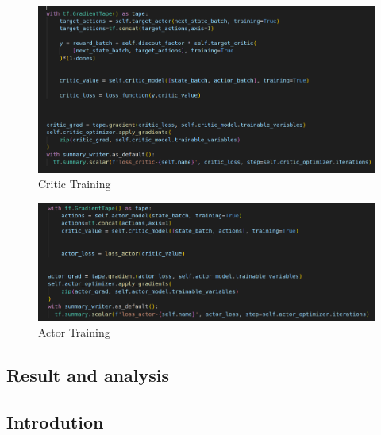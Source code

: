 \documentclass[12pt]{extarticle}
\begin{document}
    
 \begin{figure}[h]  
\centering
\includegraphics[scale=0.35]{critic_training}
\caption[Critic Training]{Critic Training}
\end{figure}




   
 \begin{figure}[t]  
\centering
\includegraphics[scale=0.35]{actor_training}
\caption[Actor Training]{Actor Training}
\end{figure}



\afterpage{\clearpage}





\newpage
\pagebreak
\hspace{0pt}
\vfill
\begin{center}
\section{Result and analysis}
\end{center}
\vfill
\hspace{0pt}

\pagebreak

\subsection{Introdution}
\end{document}
